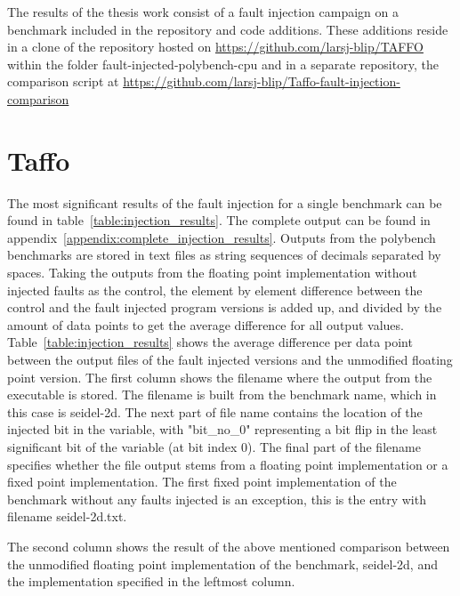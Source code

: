 
The results of the thesis work consist of a fault injection campaign on a benchmark included in the \taffo{} repository and code additions. These additions reside in a clone of the \taffo{} repository hosted on \url{https://github.com/larsj-blip/TAFFO} within the folder fault-injected-polybench-cpu and in a separate repository, the comparison script at \url{https://github.com/larsj-blip/Taffo-fault-injection-comparison}


\section{Taffo}
The most significant results of the fault injection for a single benchmark can be found in table~\ref{table:injection_results}. The complete output can be found in appendix~\ref{appendix:complete_injection_results}. Outputs from the polybench benchmarks are stored in text files as string sequences of decimals separated by spaces. Taking the outputs from the floating point implementation without injected faults as the control, the element by element difference between the control and the fault injected program versions is added up, and divided by the amount of data points to get the average difference for all output values. Table~\ref{table:injection_results} shows the average difference per data point between the output files of the fault injected versions and the unmodified floating point version.   
The first column shows the filename where the output from the executable is stored. The filename is built from the benchmark name, which in this case is seidel-2d. The next part of file name contains the location of the injected bit in the variable, with "bit\_no\_0" representing a bit flip in the least significant bit of the variable (at bit index 0). The final part of the filename specifies whether the file output stems from a floating point implementation or a fixed point implementation.
The first fixed point implementation of the benchmark without any faults injected is an exception, this is the entry with filename seidel-2d.txt.

The second column shows the result of the above mentioned comparison between the unmodified floating point implementation of the benchmark, seidel-2d, and the implementation specified in the leftmost column. 


